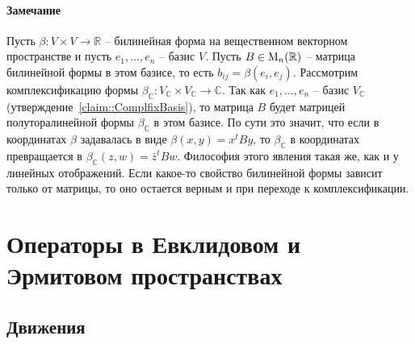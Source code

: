 \paragraph{Замечание}

Пусть $\beta\colon V\times V\to \mathbb R$ -- билинейная форма на вещественном векторном пространстве и пусть $e_1,\ldots,e_n$ -- базис $V$.
Пусть $B\in \operatorname{M}_{n}(\mathbb R)$ -- матрица билинейной формы в этом базисе, то есть $b_{ij} = \beta(e_i,e_j)$.
Рассмотрим комплексификацию формы $\beta_\mathbb C \colon V_\mathbb C\times V_\mathbb C\to \mathbb C$.
Так как $e_1,\ldots,e_n$ -- базис $V_\mathbb C$ (утверждение~\ref{claim::ComplfixBasis}), то матрица $B$ будет матрицей полуторалинейной формы $\beta_\mathbb C$ в этом базисе.
По сути это значит, что если в координатах $\beta$ задавалась в виде $\beta(x, y) = x^t B y$, то $\beta_\mathbb C$ в координатах превращается в $\beta_\mathbb C(z, w) = \bar z^t B w$.
Философия этого явления такая же, как и у линейных отображений.
Если какое-то свойство билинейной формы зависит только от матрицы, то оно остается верным и при переходе к комплексификации.

\newpage
\section{Операторы в Евклидовом и Эрмитовом пространствах}

\subsection{Движения}

